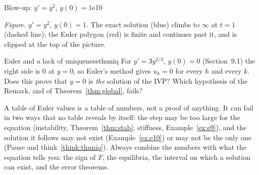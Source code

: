 \documentclass[11pt]{article}
\begin{document}
\begin{exmp}{Blow-up: $y'=y^2$, $y(0)=1$}{e10}
\begin{center}
\par\small\emph{Figure.} $y'=y^2$, $y(0)=1$. The exact solution (blue) climbs to $\infty$ at $t=1$ (dashed line); the Euler polygon (red) is finite and continues past it, and is clipped at the top of the picture.
\end{center}
\end{exmp}

\begin{think}{Euler and a lack of uniqueness}{thuniq}
For $y'=3y^{2/3}$, $y(0)=0$ (Section~9.1) the right side is $0$ at $y=0$, so Euler's method gives $u_k=0$ for every $h$ and every $k$. Does this prove that $y=0$ is \emph{the} solution of the IVP? Which hypothesis of the Remark, and of Theorem~\ref{thm:global}, fails?
\end{think}

\begin{warn}
A table of Euler values is a table of numbers, not a proof of anything. It can fail in two ways that no table reveals by itself: the step may be too large for the equation (instability, Theorem~\ref{thm:stab}; stiffness, Example~\ref{ex:e9}), and the solution it follows may not exist (Example~\ref{ex:e10}) or may not be the only one (Pause and think~\ref{think:thuniq}). Always combine the numbers with what the equation tells you: the sign of $F$, the equilibria, the interval on which a solution can exist, and the error theorems.
\end{warn}
\end{document}
